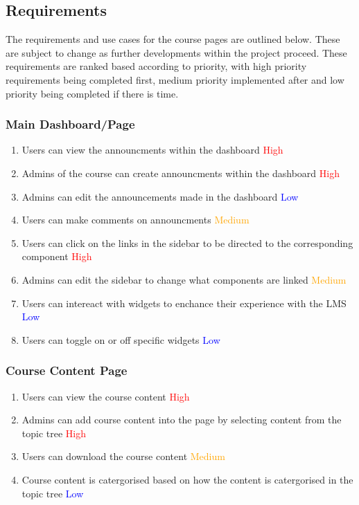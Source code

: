 \subsection{Requirements}
The requirements and use cases for the course pages are outlined below. These are subject to change as further developments within the project proceed.
These requirements are ranked based according to priority, with high priority requirements being completed first, medium priority implemented after and low priority being completed if there is time.
\subsubsection{Main Dashboard/Page}
\begin{enumerate}
    \item Users can view the announcments within the dashboard \textcolor{Red}{High}
    \item Admins of the course can create announcments within the dashboard \textcolor{Red}{High}
    \item Admins can edit the announcements made in the dashboard \textcolor{Blue}{Low}
    \item Users can make comments on announcments \textcolor{Orange}{Medium}
    \item Users can click on the links in the sidebar to be directed to the corresponding component \textcolor{Red}{High}
    \item Admins can edit the sidebar to change what components are linked \textcolor{Orange}{Medium}
    \item Users can intereact with widgets to enchance their experience with the LMS \textcolor{Blue}{Low}
    \item Users can toggle on or off specific widgets \textcolor{Blue}{Low}
\end{enumerate}

\subsubsection{Course Content Page}
\begin{enumerate}
    \item Users can view the course content \textcolor{Red}{High}
    \item Admins can add course content into the page by selecting content from the topic tree \textcolor{Red}{High}
    \item Users can download the course content \textcolor{Orange}{Medium}
    \item Course content is catergorised based on how the content is catergorised in the topic tree \textcolor{Blue}{Low}
\end{enumerate}

